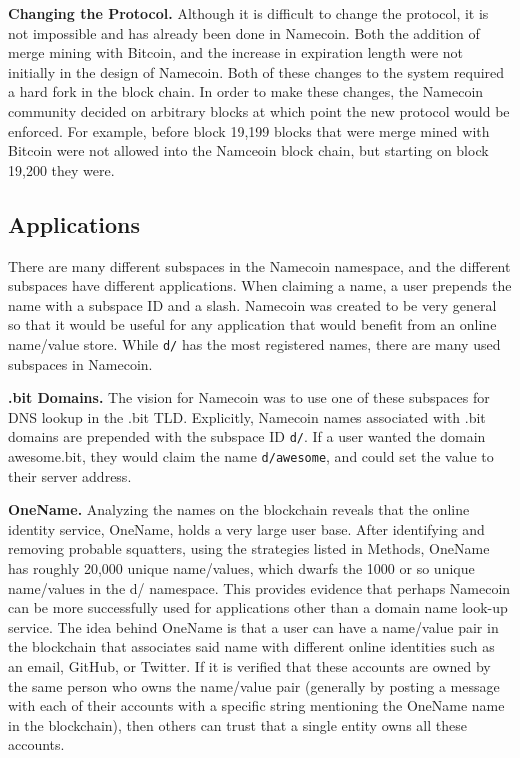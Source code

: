 {\bf Changing the Protocol.}
Although it is difficult to change the protocol, it is not impossible and has already been done in Namecoin. Both the addition of merge mining with Bitcoin, and the increase in expiration length were not initially in the design of Namecoin. Both of these changes to the system required a hard fork in the block chain. In order to make these changes, the Namecoin community decided on arbitrary blocks at which point the new protocol would be enforced. For example, before block 19,199 blocks that were merge mined with Bitcoin were not allowed into the Namceoin block chain, but starting on block 19,200 they were. 
 
\subsection{Applications}

There are many different subspaces in the Namecoin namespace, and the different subspaces have different applications. When claiming a name, a user prepends the name with a subspace ID and a slash. Namecoin was created to be very general so that it would be useful for any application that would benefit from an online name/value store. While {\tt d/} has the most registered names, there are many used subspaces in Namecoin.

{\bf .bit Domains.}
The vision for Namecoin was to use one of these subspaces for DNS lookup in the .bit TLD. Explicitly, Namecoin names associated with .bit domains are prepended with the subspace ID {\tt d/}. If a user wanted the domain awesome.bit, they would claim the name {\tt d/awesome}, and could set the value to their server address. 

{\bf OneName.}
Analyzing the names on the blockchain reveals that the online identity service, OneName, holds a very large user base. After identifying and removing probable squatters, using the strategies listed in Methods, OneName has roughly 20,000 unique name/values, which dwarfs the 1000 or so unique name/values in the d/ namespace. This provides evidence that perhaps Namecoin can be more successfully used for applications other than a domain name look-up service. The idea behind OneName is that a user can have a name/value pair in the blockchain that associates said name with different online identities such as an email, GitHub, or Twitter. If it is verified that these accounts are owned by the same person who owns the name/value pair (generally by posting a message with each of their accounts with a specific string mentioning the OneName name in the blockchain), then others can trust that a single entity owns all these accounts. 

